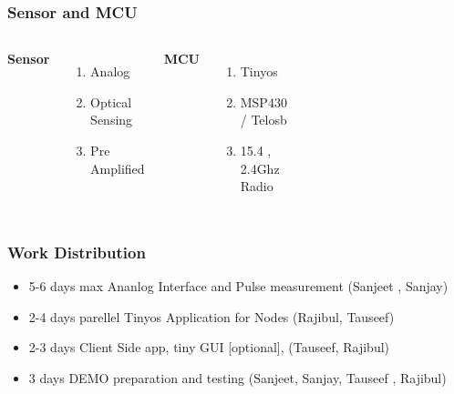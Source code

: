 \documentclass{beamer}
\begin{document}
\begin{frame}
\frametitle{Sensor and MCU}
\begin{columns}[c] %

\textbf{Sensor}
\begin{enumerate}
\item Analog
\item Optical Sensing
\item Pre Amplified
\end{enumerate}
\textbf{MCU}
\begin{enumerate}
\item Tinyos
\item MSP430 / Telosb
\item 15.4 , 2.4Ghz Radio
\end{enumerate}

\begin{figure}[H]
 \centering
 \includegraphics[width=3cm]{sensor}
\end{figure}
\begin{figure}[H]
 \centering
 \includegraphics[width=3cm]{telos}
\end{figure}
\end{columns}
\end{frame}
\begin{frame}
\frametitle{Work Distribution}
\begin{itemize}
\item 5-6 days max Ananlog Interface and Pulse measurement (Sanjeet , Sanjay)
\item 2-4 days parellel Tinyos Application for Nodes (Rajibul, Tauseef)
\item 2-3 days Client Side app, tiny GUI [optional], (Tauseef, Rajibul)
\item 3 days DEMO preparation and testing (Sanjeet, Sanjay, Tauseef , Rajibul)
\end{itemize}
\end{frame}
\end{document}
